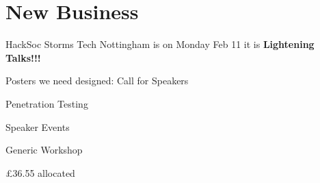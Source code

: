 \documentclass[11pt,hacksoc]{meetingmins}
\begin{document}
\section{New Business}
\begin{items}
	\item
	HackSoc Storms Tech Nottingham is on Monday Feb 11 it is \textbf{Lightening Talks!!!}
	
	\item
	
	\item
	Posters we need designed:
		\subitem
		Call for Speakers
		
		\subitem
		Penetration Testing
		
		\subitem
		Speaker Events
		
		\subitem
		Generic Workshop
		
		\subitem
		
		\subitem
		
		\subitem
		\pounds36.55 allocated
		
\end{items}

\vspace{1em}
\end{document}
